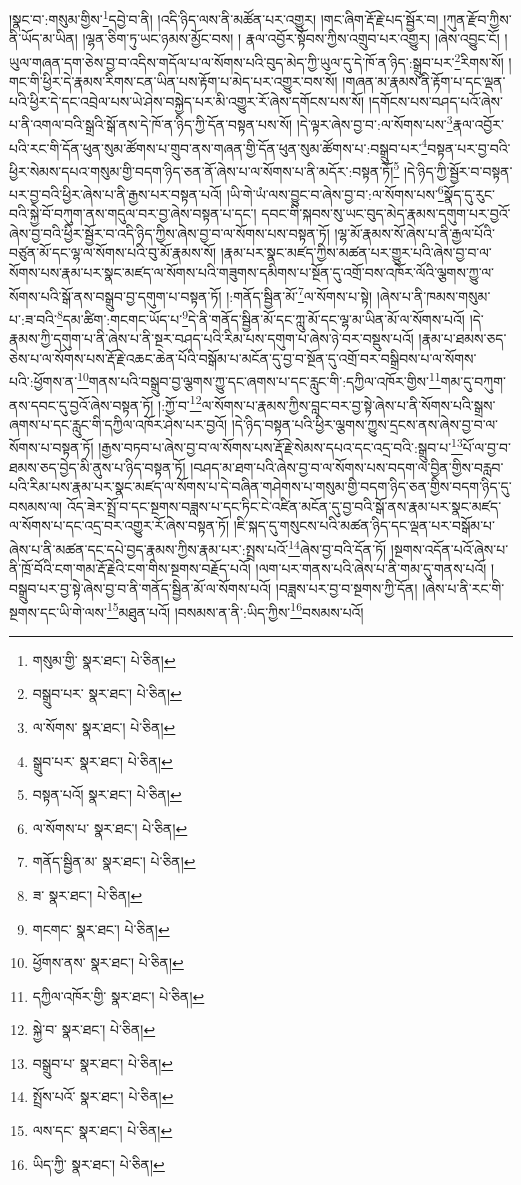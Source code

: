 །སྣང་བ་:གསུམ་གྱིས་\footnote{གསུམ་གྱི་  སྣར་ཐང་།  པེ་ཅིན། }དབྱེ་བ་ནི། །འདི་ཉིད་ལས་ནི་མཚོན་པར་འགྱུར། །གང་ཞིག་རྡོ་རྗེ་པད་སྦྱོར་བ། །ཀུན་རྫོབ་ཀྱིས་ནི་ཡོད་མ་ཡིན། །ལྷན་ཅིག་ཏུ་ཡང་ཉམས་མྱོང་བས། །
རྣལ་འབྱོར་སྟོབས་ཀྱིས་འགྲུབ་པར་འགྱུར། །ཞེས་འབྱུང་ངོ། །ཡུལ་གཞན་དག་ཅེས་བྱ་བ་འདིས་གདོལ་པ་ལ་སོགས་པའི་བུད་མེད་ཀྱི་ཡུལ་དུ་དེ་ཁོ་ན་ཉིད་:སྒྲུབ་པར་\footnote{བསྒྲུབ་པར་  སྣར་ཐང་།  པེ་ཅིན། }རིགས་སོ། །གང་གི་ཕྱིར་དེ་རྣམས་རིགས་ངན་ཡིན་པས་རྟོག་པ་མེད་པར་འགྱུར་བས་སོ། །གཞན་མ་རྣམས་ནི་རྟོག་པ་དང་ལྡན་པའི་ཕྱིར་དེ་དང་འབྲེལ་པས་ཡེ་ཤེས་བསྐྱེད་པར་མི་འགྱུར་རོ་ཞེས་དགོངས་པས་སོ། །དགོངས་པས་བཤད་པའོ་ཞེས་པ་ནི་འགལ་བའི་སྒྲའི་སྒོ་ནས་དེ་ཁོ་ན་ཉིད་ཀྱི་དོན་བསྟན་པས་སོ། །དེ་ལྟར་ཞེས་བྱ་བ་:ལ་སོགས་པས་\footnote{ལ་སོགས་  སྣར་ཐང་།  པེ་ཅིན། }རྣལ་འབྱོར་པའི་རང་གི་དོན་ཕུན་སུམ་ཚོགས་པ་གྲུབ་ནས་གཞན་གྱི་དོན་ཕུན་སུམ་ཚོགས་པ་:བསྒྲུབ་པར་\footnote{སྒྲུབ་པར་  སྣར་ཐང་།  པེ་ཅིན། }བསྟན་པར་བྱ་བའི་ཕྱིར་སེམས་དཔའ་གསུམ་གྱི་བདག་ཉིད་ཅན་ནོ་ཞེས་པ་ལ་སོགས་པ་ནི་མདོར་:བསྟན་ཏོ།\footnote{བསྟན་པའོ།  སྣར་ཐང་།  པེ་ཅིན། } །དེ་ཉིད་ཀྱི་སྦྱོར་བ་བསྟན་པར་བྱ་བའི་ཕྱིར་ཞེས་པ་ནི་རྒྱས་པར་བསྟན་པའོ། །ཡི་གེ་ཡཾ་ལས་བྱུང་བ་ཞེས་བྱ་བ་:ལ་སོགས་པས་\footnote{ལ་སོགས་པ་  སྣར་ཐང་།  པེ་ཅིན། }སྣོད་དུ་རུང་བའི་སྐྱེ་བོ་བཀུག་ནས་གདུལ་བར་བྱ་ཞེས་བསྟན་པ་དང་། དབང་གི་སྐབས་སུ་ཡང་བུད་མེད་རྣམས་དགུག་པར་བྱའོ་ཞེས་བྱ་བའི་ཕྱིར་སྦྱོར་བ་འདི་ཉིད་ཀྱིས་ཞེས་བྱ་བ་ལ་སོགས་པས་བསྟན་ཏོ། །ལྷ་མོ་རྣམས་སོ་ཞེས་པ་ནི་རྒྱལ་པོའི་བཙུན་མོ་དང་ལྷ་ལ་སོགས་པའི་བུ་མོ་རྣམས་སོ། །རྣམ་པར་སྣང་མཛད་ཀྱིས་མཚན་པར་གྱུར་པའི་ཞེས་བྱ་བ་ལ་སོགས་པས་རྣམ་པར་སྣང་མཛད་ལ་སོགས་པའི་གཟུགས་དམིགས་པ་སྔོན་དུ་འགྲོ་བས་འཁོར་ལོའི་ལྕགས་ཀྱུ་ལ་སོགས་པའི་སྒོ་ནས་བསྒྲུབ་བྱ་དགུག་པ་བསྟན་ཏོ། །:གནོད་སྦྱིན་མོ་\footnote{གནོད་སྦྱིན་མ་  སྣར་ཐང་།  པེ་ཅིན། }ལ་སོགས་པ་སྟེ། །ཞེས་པ་ནི་ཁམས་གསུམ་པ་:ཟ་བའི་\footnote{ཟ་  སྣར་ཐང་།  པེ་ཅིན། }དམ་ཚིག་:གངགང་ཡོད་པ་\footnote{གངགང་  སྣར་ཐང་།  པེ་ཅིན། }དེ་ནི་གནོད་སྦྱིན་མོ་དང་ཀླུ་མོ་དང་ལྷ་མ་ཡིན་མོ་ལ་སོགས་པའོ། །དེ་རྣམས་ཀྱི་དགུག་པ་ནི་ཞེས་པ་ནི་སྔར་བཤད་པའི་རིམ་པས་དགུག་པ་ཞེས་ཉེ་བར་བསྡུས་པའོ། །རྣམ་པ་ཐམས་ཅད་ཅེས་པ་ལ་སོགས་པས་རྡོ་རྗེ་འཆང་ཆེན་པོའི་བསྒོམ་པ་མངོན་དུ་བྱ་བ་སྔོན་དུ་འགྲོ་བར་བསྒྲིབས་པ་ལ་སོགས་པའི་:ཕྱོགས་ན་\footnote{ཕྱོགས་ནས་  སྣར་ཐང་།  པེ་ཅིན། }གནས་པའི་བསྒྲུབ་བྱ་ལྕགས་ཀྱུ་དང་ཞགས་པ་དང་རླུང་གི་:དཀྱིལ་འཁོར་གྱིས་\footnote{དཀྱིལ་འཁོར་གྱི་  སྣར་ཐང་།  པེ་ཅིན། }གམ་དུ་བཀུག་ནས་དབང་དུ་བྱའོ་ཞེས་བསྟན་ཏོ། །:ཀྱོ་བ་\footnote{སྐྱེ་བ་  སྣར་ཐང་།  པེ་ཅིན། }ལ་སོགས་པ་རྣམས་ཀྱིས་བླང་བར་བྱ་སྟེ་ཞེས་པ་ནི་སོགས་པའི་སྒྲས་ཞགས་པ་དང་རླུང་གི་དཀྱིལ་འཁོར་ཤེས་པར་བྱའོ། །དེ་ཉིད་བསྟན་པའི་ཕྱིར་ལྕགས་ཀྱུས་དྲངས་ནས་ཞེས་བྱ་བ་ལ་སོགས་པ་བསྟན་ཏོ། །རྒྱས་བཏབ་པ་ཞེས་བྱ་བ་ལ་སོགས་པས་རྡོ་རྗེ་སེམས་དཔའ་དང་འདྲ་བའི་:སྒྲུབ་པ་\footnote{བསྒྲུབ་པ་  སྣར་ཐང་།  པེ་ཅིན། }པོ་ལ་བྱ་བ་ཐམས་ཅད་བྱེད་མི་ནུས་པ་ཉིད་བསྟན་ཏོ། །བཤད་མ་ཐག་པའི་ཞེས་བྱ་བ་ལ་སོགས་པས་བདག་ལ་བྱིན་གྱིས་བརླབ་པའི་རིམ་པས་རྣམ་པར་སྣང་མཛད་ལ་སོགས་པ་དེ་བཞིན་གཤེགས་པ་གསུམ་གྱི་བདག་ཉིད་ཅན་གྱིས་བདག་ཉིད་དུ་བསམས་ལ། འོད་ཟེར་སྤྲོ་བ་དང་སྔགས་བཟླས་པ་དང་ཏིང་ངེ་འཛིན་མངོན་དུ་བྱ་བའི་སྒོ་ནས་རྣམ་པར་སྣང་མཛད་ལ་སོགས་པ་དང་འདྲ་བར་འགྱུར་རོ་ཞེས་བསྟན་ཏོ། །ཇི་སྐད་དུ་གསུངས་པའི་མཚན་ཉིད་དང་ལྡན་པར་བསྒོམ་པ་ཞེས་པ་ནི་མཚན་དང་དཔེ་བྱད་རྣམས་ཀྱིས་རྣམ་པར་:སྤྲས་པའོ་\footnote{སྤྲོས་པའོ་  སྣར་ཐང་།  པེ་ཅིན། }ཞེས་བྱ་བའི་དོན་ཏོ། །སྔགས་འདོན་པའོ་ཞེས་པ་ནི་ཁྲོ་བོའི་ངག་གམ་རྡོ་རྗེའི་ངག་གིས་སྔགས་བརྗོད་པའོ། །ལག་པར་གནས་པའི་ཞེས་པ་ནི་གམ་དུ་གནས་པའོ། །བསྒྲུབ་པར་བྱ་སྟེ་ཞེས་བྱ་བ་ནི་གནོད་སྦྱིན་མོ་ལ་སོགས་པའོ། །བཟླས་པར་བྱ་བ་སྔགས་ཀྱི་དོན། །ཞེས་པ་ནི་རང་གི་སྔགས་དང་ཡི་གེ་ལས་\footnote{ལས་དང་  སྣར་ཐང་།  པེ་ཅིན། }མཐུན་པའོ། །བསམས་ན་ནི་:ཡིད་ཀྱིས་\footnote{ཡིད་ཀྱི་  སྣར་ཐང་།  པེ་ཅིན། }བསམས་པའོ། 